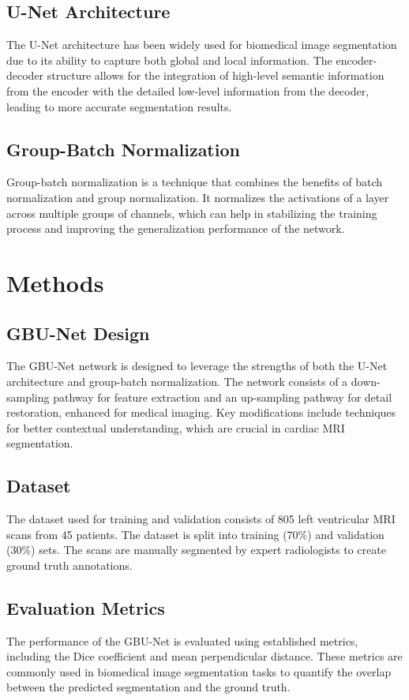 \documentclass[11pt]{article}
\begin{document}
\subsection{U-Net Architecture}
The U-Net architecture has been widely used for biomedical image segmentation due to its ability to capture both global and local information. The encoder-decoder structure allows for the integration of high-level semantic information from the encoder with the detailed low-level information from the decoder, leading to more accurate segmentation results.

\subsection{Group-Batch Normalization}
Group-batch normalization is a technique that combines the benefits of batch normalization and group normalization. It normalizes the activations of a layer across multiple groups of channels, which can help in stabilizing the training process and improving the generalization performance of the network.

\section{Methods}
\subsection{GBU-Net Design}
The GBU-Net network is designed to leverage the strengths of both the U-Net architecture and group-batch normalization. The network consists of a down-sampling pathway for feature extraction and an up-sampling pathway for detail restoration, enhanced for medical imaging. Key modifications include techniques for better contextual understanding, which are crucial in cardiac MRI segmentation.

\subsection{Dataset}
The dataset used for training and validation consists of 805 left ventricular MRI scans from 45 patients. The dataset is split into training (70\%) and validation (30\%) sets. The scans are manually segmented by expert radiologists to create ground truth annotations.

\subsection{Evaluation Metrics}
The performance of the GBU-Net is evaluated using established metrics, including the Dice coefficient and mean perpendicular distance. These metrics are commonly used in biomedical image segmentation tasks to quantify the overlap between the predicted segmentation and the ground truth.
\end{document}
